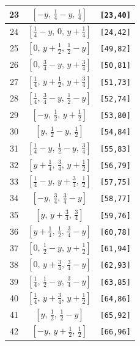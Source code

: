 \documentclass[fleqn,8pt]{jsarticle}
\begin{document}
\begin{longtable}{ccc}
23 & $\left[ - y,\, \frac{1}{4} - y,\, \frac{1}{4} \right]$ & {\tt [23,40]} \\ \hline
24 & $\left[ \frac{1}{4} - y,\, 0,\, y + \frac{1}{4} \right]$ & {\tt [24,42]} \\ \hline
25 & $\left[ 0,\, y + \frac{1}{2},\, \frac{1}{2} - y \right]$ & {\tt [49,82]} \\ \hline
26 & $\left[ 0,\, \frac{3}{4} - y,\, y + \frac{3}{4} \right]$ & {\tt [50,81]} \\ \hline
27 & $\left[ \frac{1}{4},\, y + \frac{1}{2},\, y + \frac{3}{4} \right]$ & {\tt [51,73]} \\ \hline
28 & $\left[ \frac{1}{4},\, \frac{3}{4} - y,\, \frac{1}{2} - y \right]$ & {\tt [52,74]} \\ \hline
29 & $\left[ - y,\, \frac{1}{2},\, y + \frac{1}{2} \right]$ & {\tt [53,80]} \\ \hline
30 & $\left[ y,\, \frac{1}{2} - y,\, \frac{1}{2} \right]$ & {\tt [54,84]} \\ \hline
31 & $\left[ \frac{1}{4} - y,\, \frac{1}{2} - y,\, \frac{3}{4} \right]$ & {\tt [55,83]} \\ \hline
32 & $\left[ y + \frac{1}{4},\, \frac{3}{4},\, y + \frac{1}{2} \right]$ & {\tt [56,79]} \\ \hline
33 & $\left[ \frac{1}{4} - y,\, y + \frac{3}{4},\, \frac{1}{2} \right]$ & {\tt [57,75]} \\ \hline
34 & $\left[ - y,\, \frac{3}{4},\, \frac{3}{4} - y \right]$ & {\tt [58,77]} \\ \hline
35 & $\left[ y,\, y + \frac{3}{4},\, \frac{3}{4} \right]$ & {\tt [59,76]} \\ \hline
36 & $\left[ y + \frac{1}{4},\, \frac{1}{2},\, \frac{3}{4} - y \right]$ & {\tt [60,78]} \\ \hline
37 & $\left[ 0,\, \frac{1}{2} - y,\, y + \frac{1}{2} \right]$ & {\tt [61,94]} \\ \hline
38 & $\left[ 0,\, y + \frac{3}{4},\, \frac{3}{4} - y \right]$ & {\tt [62,93]} \\ \hline
39 & $\left[ \frac{1}{4},\, \frac{1}{2} - y,\, \frac{3}{4} - y \right]$ & {\tt [63,85]} \\ \hline
40 & $\left[ \frac{1}{4},\, y + \frac{3}{4},\, y + \frac{1}{2} \right]$ & {\tt [64,86]} \\ \hline
41 & $\left[ y,\, \frac{1}{2},\, \frac{1}{2} - y \right]$ & {\tt [65,92]} \\ \hline
42 & $\left[ - y,\, y + \frac{1}{2},\, \frac{1}{2} \right]$ & {\tt [66,96]} \\ \hline

\end{longtable}
\end{document}
